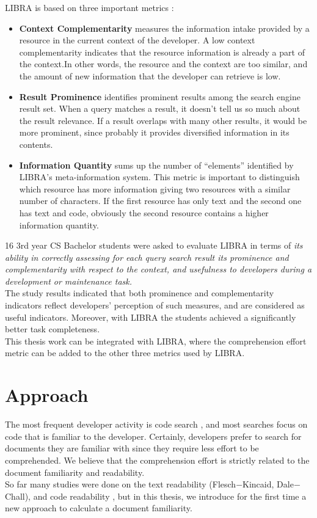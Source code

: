 \documentclass[12pt,mscthesis]{usiinfthesis}
\begin{document}
	LIBRA is based on three important metrics :
	
	\begin{itemize}
	\item \textbf{Context Complementarity} measures the information intake provided by a resource in the current context of the developer. A low context complementarity indicates that the resource information is already a part of the context.In other words, the resource and the context are too similar, and the amount of new information that the developer can retrieve is low.
	
	\item \textbf{Result Prominence} identifies prominent results among the search engine result set. When a query matches a result, it doesn't tell us so much about the result relevance. If a result overlaps with many other results, it would be more prominent, since probably it provides diversified information in its contents.
	
	\item \textbf{Information Quantity} sums up the number of ``elements'' identified by LIBRA's meta-information system. This metric is important to distinguish which resource has more information giving two resources with a similar number of characters. If the first resource has only text and the second one has text and code, obviously the second resource contains a higher information quantity.
	\end{itemize}

	16 3rd year CS Bachelor students were asked to evaluate LIBRA in terms of \textit{its ability in correctly assessing for each query search result its prominence and complementarity with respect to the context, and usefulness to developers during a development or maintenance task.}\\
	The study results indicated that both prominence and complementarity indicators reflect developers’ perception of such measures, and are considered as useful indicators. Moreover, with LIBRA the students  achieved a significantly better task completeness.\\

	This thesis work can be integrated with LIBRA, where the comprehension effort metric can be added to the other three metrics used by LIBRA.


\chapter{Approach}
 The most frequent developer activity is code search \cite{Singer-1997}, and most searches focus on code that is familiar to the developer\cite{Sadowski:2015}. Certainly, developers prefer to search for documents they are familiar with since they require less effort to be comprehended. We believe that the comprehension effort is strictly related to the document familiarity and readability.\\
 So far many studies were done on the text readability (Flesch$-$Kincaid, Dale$-$Chall), and code readability \cite{Buse:2010:LMC:1850489.1850615}, but in this thesis, we introduce for the first time a new approach to calculate a document familiarity.\\
\end{document}
